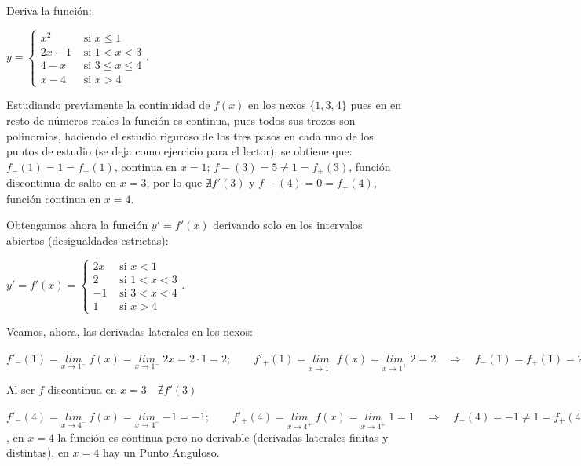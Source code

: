 	\begin{ejem} Deriva la función:
	
	\hspace{20mm}  $y=
	\begin{cases}
		x^2 & \mbox{ si } x\le 1 \\
		2x-1 & \mbox{ si } 1<x<3 \\
		4-x & \mbox{ si } 3\le x \le 4 \\
		x-4 & \mbox{ si } x>4
	\end{cases} .$
	
	Estudiando previamente la continuidad de $f(x)$ en los nexos $\{1,3,4 \}$ pues en en resto de números reales la función es continua, pues todos sus trozos son polinomios, haciendo el estudio riguroso de los tres pasos en cada uno de los puntos de estudio (se deja como ejercicio para el lector), se obtiene que: $f_-(1)=1=f_+(1)$, continua en $x=1$; $f-(3)=5\neq 1=f_+(3)$, función discontinua de salto en $x=3$, por lo que $\nexists f'(3)$ y $f-(4)=0=f_+(4)$, función continua en $x=4$.
	
	Obtengamos ahora la función $y'=f'(x)$ derivando solo en los intervalos abiertos (desigualdades estrictas):
	
		\hspace{20mm} $y'=f'(x)=
	\begin{cases}
		2x & \mbox{ si } x< 1 \\
		2 & \mbox{ si } 1<x<3 \\
		-1 & \mbox{ si } 3< x <4 \\
		1 & \mbox{ si } x>4
	\end{cases} .$
	
	Veamos, ahora, las derivadas laterales en los nexos:
	
	$f'_-(1)=\underset{x\to 1^-}{lim}\;{f(x)}=\underset{x\to 1^-}{lim}\;{2x}=2\cdot 1=2; \qquad f'_+(1)=\underset{x\to 1^+}{lim}\;{f(x)}=\underset{x\to 1^+}{lim}\;{2}=2 \quad \Rightarrow \quad f_-(1)=f_+(1)=2 \quad \to \quad \exists f'(1)=2$
	
	Al ser $f$ discontinua en $x=3 \quad \nexists f'(3)$
	
	$f'_-(4)=\underset{x\to 4^-}{lim}\;{f(x)}=\underset{x\to 4^-}{lim}\;{-1}=-1; \qquad f'_+(4)=\underset{x\to 4^+}{lim}\;{f(x)}=\underset{x\to 4^+}{lim}\;{1}=1 \quad \Rightarrow \quad f_-(4)=-1\neq 1=f_+(4) \quad \to \quad \nexists f'(4)$, en $x=4$ la función es continua pero no derivable (derivadas laterales finitas y distintas), en $x=4$ hay un Punto Anguloso.
		
	\end{ejem}
